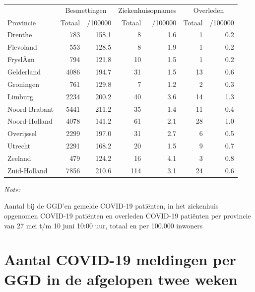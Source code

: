 \documentclass[
  english,
  man,floatsintext]{apa6}
\begin{document}
\begin{table}
\centering
\begin{threeparttable}
\begin{tabular}{lrrrrrr}
\toprule
\multicolumn{1}{c}{ } & \multicolumn{2}{c}{Besmettingen} & \multicolumn{2}{c}{Ziekenhuisopnames} & \multicolumn{2}{c}{Overleden} \\
\cmidrule(l{3pt}r{3pt}){2-3} \cmidrule(l{3pt}r{3pt}){4-5} \cmidrule(l{3pt}r{3pt}){6-7}
Provincie & Totaal & /100000 & Totaal & /100000 & Totaal & /100000\\
\midrule
Drenthe & 783 & 158.1 & 8 & 1.6 & 1 & 0.2\\
Flevoland & 553 & 128.5 & 8 & 1.9 & 1 & 0.2\\
FryslÃ¢n & 794 & 121.8 & 10 & 1.5 & 1 & 0.2\\
Gelderland & 4086 & 194.7 & 31 & 1.5 & 13 & 0.6\\
Groningen & 761 & 129.8 & 7 & 1.2 & 2 & 0.3\\
Limburg & 2234 & 200.2 & 40 & 3.6 & 14 & 1.3\\
Noord-Brabant & 5441 & 211.2 & 35 & 1.4 & 11 & 0.4\\
Noord-Holland & 4078 & 141.2 & 61 & 2.1 & 28 & 1.0\\
Overijssel & 2299 & 197.0 & 31 & 2.7 & 6 & 0.5\\
Utrecht & 2291 & 168.2 & 20 & 1.5 & 9 & 0.7\\
Zeeland & 479 & 124.2 & 16 & 4.1 & 3 & 0.8\\
Zuid-Holland & 7856 & 210.6 & 114 & 3.1 & 24 & 0.6\\
\bottomrule
\end{tabular}
\begin{tablenotes}
\item \textit{Note: } 
\item Aantal bij de GGD’en gemelde COVID-19 patiënten, in het ziekenhuis opgenomen COVID-19 patiënten en overleden COVID-19 patiënten per provincie van 27 mei t/m 10 juni 10:00 uur, totaal en per 100.000 inwoners
\end{tablenotes}
\end{threeparttable}
\end{table}

\newpage

\hypertarget{aantal-covid-19-meldingen-per-ggd-in-de-afgelopen-twee-weken}{%
\section{Aantal COVID-19 meldingen per GGD in de afgelopen twee weken}\label{aantal-covid-19-meldingen-per-ggd-in-de-afgelopen-twee-weken}}
\end{document}
